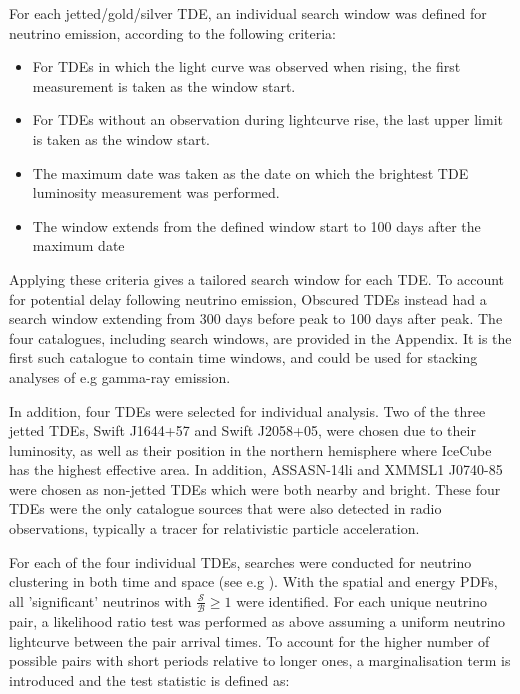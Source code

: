 For each jetted/gold/silver TDE, an individual search window was defined for neutrino emission, according to the following criteria:

\begin{itemize}
	\item For TDEs in which the light curve was observed when rising, the first measurement is taken as the window start.
	
	\item For TDEs without an observation during lightcurve rise, the last upper limit is taken as the window start.
	
	\item The maximum date was taken as the date on which the brightest TDE luminosity measurement was performed.
	
	\item The window extends from the defined window start to 100 days after the maximum date
	
\end{itemize}

Applying these criteria gives a tailored search window for each TDE. To account for potential delay following neutrino emission, Obscured TDEs instead had a search window extending from 300 days before peak to 100 days after peak. The four catalogues, including search windows, are provided in the Appendix. It is the first such catalogue to contain time windows, and could be used for stacking analyses of e.g gamma-ray emission.

In addition, four TDEs were selected for individual analysis. Two of the three jetted TDEs, Swift J1644+57 and Swift J2058+05, were chosen due to their luminosity, as well as their position in the northern hemisphere where IceCube has the highest effective area. In addition, ASSASN-14li and  XMMSL1 J0740-85 were chosen as non-jetted TDEs which were both nearby and bright. These four TDEs were the only catalogue sources that were also detected in radio observations, typically a tracer for relativistic particle acceleration.

For each of the four individual TDEs, searches were conducted for neutrino clustering in both time and space (see e.g \cite{IceCube:2018cha}). With the spatial and energy PDFs, all 'significant' neutrinos with $\frac{\mathcal{S}}{\mathcal{B}} \geq 1$ were identified. For each unique neutrino pair, a likelihood ratio test was performed as above assuming a uniform neutrino lightcurve between the pair arrival times. To account for the higher number of possible pairs with short periods relative to longer ones, a marginalisation term is introduced and the test statistic is defined as:

